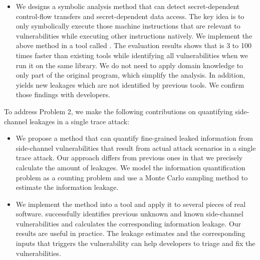 \begin{itemize}
    \item We designs a symbolic analysis method that can detect secret-dependent control-flow transfers and secret-dependent data access. The key idea is to only symbolically execute those machine instructions that are relevant to vulnerabilities while executing other instructions natively. We implement the above method in a tool called \detect{}. The evaluation results shows that \detect{} is 3 to 100 times faster than existing tools while identifying all vulnerabilities when we run it on the same library.  We do not need to apply domain knowledge to only part of the original program, which simplify the analysis. In addition, \detect{} yields new leakages which are not identified by previous tools. We confirm those findings with developers.
\end{itemize}

To address Problem 2, we make the following contributions on quantifying side-channel leakages in a single trace attack:


\begin{itemize}
    \item We propose a method that can quantify fine-grained leaked information from side-channel vulnerabilities that result from actual attack scenarios in a single trace attack. Our approach differs from previous ones in that we precisely calculate the amount of leakages. We model the information quantification problem as a counting problem and use a Monte Carlo sampling method to estimate the information leakage.
    \item We implement the method into a tool and apply it to several pieces of real software. \tool{} successfully identifies previous unknown and known side-channel vulnerabilities and calculates the corresponding information leakage. Our results are useful in practice. The leakage estimates and the corresponding inputs that triggers the vulnerability can help developers to triage and fix the vulnerabilities.
\end{itemize}

